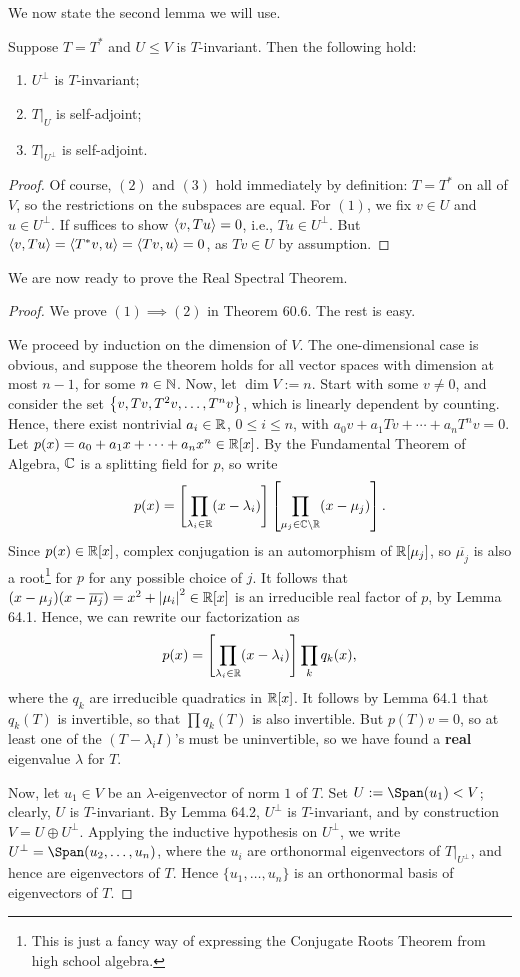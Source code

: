 \documentclass{article}
\begin{document}
We now state the second lemma we will use. \newpage
\begin{lemma}
Suppose $T = T^*$ and $U\leq V$ is $T$-invariant. Then the following hold:
\begin{enumerate}
    \item $U^\perp$ is $T$-invariant;
    \item $T|_U$ is self-adjoint;
    \item $T|_{U^\perp}$ is self-adjoint.
\end{enumerate}
\end{lemma}
\begin{proof}
Of course, $(2)$ and $(3)$ hold immediately by definition: $T = T^*$ on all of $V$, so the restrictions on the subspaces are equal. For $(1)$, we fix $v\in U$ and $u\in U^\perp$. If suffices to show $\left\langle v, Tu\right\rangle = 0$, i.e., $Tu\in U^\perp$. But $\left\langle v, Tu\right\rangle = \left\langle T^*v, u\right\rangle = \left\langle Tv, u\right\rangle = 0$, as $Tv\in U$ by assumption.
\end{proof}

We are now ready to prove the Real Spectral Theorem.
\begin{proof}
We prove $(1)\implies (2)$ in Theorem 60.6. The rest is easy.

We proceed by induction on the dimension of $V$. The one-dimensional case is obvious, and suppose the theorem holds for all vector spaces with dimension at most $n-1$, for some $n\in\mathbb N$. Now, let $\dim V := n$. Start with some $v\neq 0$, and consider the set $\left\{v, Tv, T^2v, \ldots, T^nv\right\}$, which is linearly dependent by counting. Hence, there exist nontrivial $a_i\in \mathbb R$, $0\leq i\leq n$, with $a_0v + a_1Tv + \cdots + a_nT^nv = 0$. Let $p(x) = a_0 + a_1x + \cdots + a_nx^n\in\mathbb R[x]$. By the Fundamental Theorem of Algebra, $\mathbb C$ is a splitting field for $p$, so write
$$p(x) = \left[\prod_{\lambda_i\in\mathbb R} (x - \lambda_i )\right]\left[\prod_{\mu_j\in\mathbb C\setminus\mathbb R} (x - \mu_j)\right].$$
Since $p(x)\in\mathbb R[x]$, complex conjugation is an automorphism of $\mathbb R[\mu_j]$, so $\overline{\mu_j}$ is also a root\footnote{This is just a fancy way of expressing the Conjugate Roots Theorem from high school algebra.} for $p$ for any possible choice of $j$. It follows that $(x-\mu_j)(x-\overline{\mu_j}) = x^2  + \left|\mu_i\right|^2\in\mathbb R[x]$ is an irreducible real factor of $p$, by Lemma 64.1. Hence, we can rewrite our factorization as
$$p(x) = \left[\prod_{\lambda_i\in\mathbb R} (x-\lambda_i)\right] \prod_k q_k(x),$$
where the $q_k$ are irreducible quadratics in $\mathbb R[x]$. It follows by Lemma 64.1 that $q_k(T)$ is invertible, so that $\prod q_k(T)$ is also invertible. But $p(T)v = 0$, so at least one of the $(T-\lambda_iI)$'s must be uninvertible, so we have found a \textbf{real} eigenvalue $\lambda$ for $T$.

Now, let $u_1\in V$ be an $\lambda$-eigenvector of norm $1$ of $T$. Set $U := \Span(u_1) < V$; clearly, $U$ is $T$-invariant. By Lemma 64.2, $U^\perp$ is $T$-invariant, and by construction $V = U\oplus U^\perp$. Applying the inductive hypothesis on $U^\perp$, we write $U^\perp = \Span(u_2, \ldots, u_n)$, where the $u_i$ are orthonormal eigenvectors of $T|_{U^\perp}$, and hence are eigenvectors of $T$. Hence $\{u_1, \ldots, u_n\}$ is an orthonormal basis of eigenvectors of $T$.
\end{proof}
\end{document}
